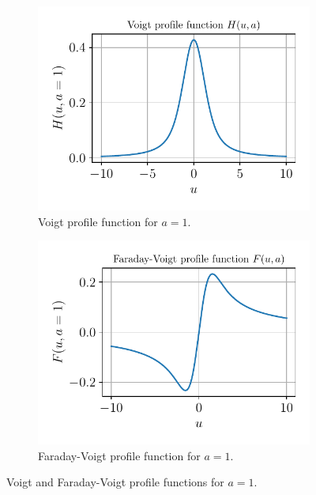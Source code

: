 \documentclass[a4paper,11pt]{report}
\begin{document}
\begin{figure}[h]
\centering
\begin{subfigure}[t]{0.49\textwidth}
    \centering
    \includegraphics[width=\textwidth]{figures/voightprofile.pdf}
    \caption{Voigt profile function for $a=1$.}
    \label{fig:voightprofile}
\end{subfigure}
\hfill
\begin{subfigure}[t]{0.49\textwidth}
    \centering
    \includegraphics[width=\textwidth]{figures/voightfaradayprofile.pdf}
    \caption{Faraday-Voigt profile function for $a=1$.}
    \label{fig:faradayvoightprofile}
\end{subfigure}
\caption{Voigt and Faraday-Voigt profile functions for $a=1$.}
\label{fig:profilefunctions}
\end{figure}
\end{document}
